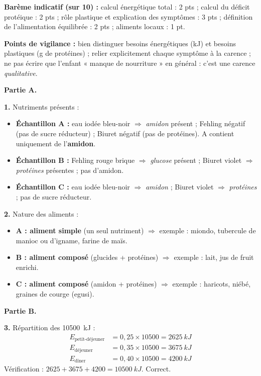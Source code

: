 \documentclass[11pt]{article}
\begin{document}
\begin{corrige}
\textbf{Barème indicatif (sur 10) :} calcul énergétique total : 2 pts ; calcul du déficit protéique : 2 pts ; rôle plastique et explication des symptômes : 3 pts ; définition de l'alimentation équilibrée : 2 pts ; aliments locaux : 1 pt.

\textbf{Points de vigilance :} bien distinguer besoins énergétiques (kJ) et besoins plastiques (g de protéines) ; relier explicitement chaque symptôme à la carence ; ne pas écrire que l'enfant « manque de nourriture » en général : c'est une carence \emph{qualitative}.
\end{corrige}

\begin{corrige}
\textbf{Partie A.}

\textbf{1.} Nutriments présents :
\begin{itemize}
\item \textbf{Échantillon A :} eau iodée bleu-noir $\Rightarrow$ \emph{amidon} présent ; Fehling négatif (pas de sucre réducteur) ; Biuret négatif (pas de protéines). A contient uniquement de l'\textbf{amidon}.
\item \textbf{Échantillon B :} Fehling rouge brique $\Rightarrow$ \emph{glucose} présent ; Biuret violet $\Rightarrow$ \emph{protéines} présentes ; pas d'amidon.
\item \textbf{Échantillon C :} eau iodée bleu-noir $\Rightarrow$ \emph{amidon} ; Biuret violet $\Rightarrow$ \emph{protéines} ; pas de sucre réducteur.
\end{itemize}

\textbf{2.} Nature des aliments :
\begin{itemize}
\item \textbf{A : aliment simple} (un seul nutriment) $\Rightarrow$ exemple : miondo, tubercule de manioc ou d'igname, farine de maïs.
\item \textbf{B : aliment composé} (glucides + protéines) $\Rightarrow$ exemple : lait, jus de fruit enrichi.
\item \textbf{C : aliment composé} (amidon + protéines) $\Rightarrow$ exemple : haricots, niébé, graines de courge (egusi).
\end{itemize}

\textbf{Partie B.}

\textbf{3.} Répartition des \SI{10500}{kJ} :
\begin{align*}
E_{\text{petit-déjeuner}} &= 0{,}25 \times 10500 = \SI{2625}{kJ}\\
E_{\text{déjeuner}} &= 0{,}35 \times 10500 = \SI{3675}{kJ}\\
E_{\text{dîner}} &= 0{,}40 \times 10500 = \SI{4200}{kJ}
\end{align*}
Vérification : $2625 + 3675 + 4200 = \SI{10500}{kJ}$. Correct.


\end{corrige}
\end{document}

